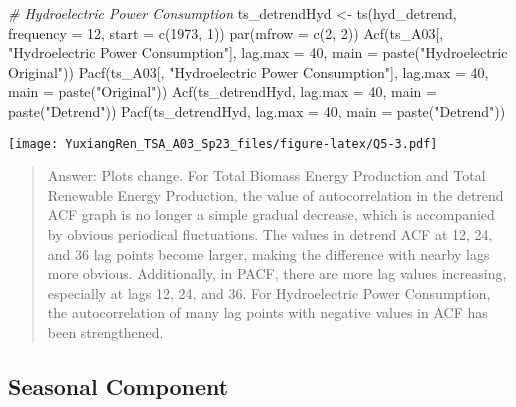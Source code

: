 \documentclass[
]{article}
\newenvironment{Shaded}{\begin{snugshade}}{\end{snugshade}}
\newcommand{\AttributeTok}[1]{\textcolor[rgb]{0.77,0.63,0.00}{#1}}
\newcommand{\CommentTok}[1]{\textcolor[rgb]{0.56,0.35,0.01}{\textit{#1}}}
\newcommand{\DecValTok}[1]{\textcolor[rgb]{0.00,0.00,0.81}{#1}}
\newcommand{\FunctionTok}[1]{\textcolor[rgb]{0.00,0.00,0.00}{#1}}
\newcommand{\NormalTok}[1]{#1}
\newcommand{\OtherTok}[1]{\textcolor[rgb]{0.56,0.35,0.01}{#1}}
\newcommand{\StringTok}[1]{\textcolor[rgb]{0.31,0.60,0.02}{#1}}
\begin{document}
\begin{Shaded}
\begin{Highlighting}[]
\CommentTok{\# Hydroelectric Power Consumption}
\NormalTok{ts\_detrendHyd }\OtherTok{\textless{}{-}} \FunctionTok{ts}\NormalTok{(hyd\_detrend, }\AttributeTok{frequency =} \DecValTok{12}\NormalTok{, }\AttributeTok{start =} \FunctionTok{c}\NormalTok{(}\DecValTok{1973}\NormalTok{, }\DecValTok{1}\NormalTok{))}
\FunctionTok{par}\NormalTok{(}\AttributeTok{mfrow =} \FunctionTok{c}\NormalTok{(}\DecValTok{2}\NormalTok{, }\DecValTok{2}\NormalTok{))}
\FunctionTok{Acf}\NormalTok{(ts\_A03[, }\StringTok{"Hydroelectric Power Consumption"}\NormalTok{], }\AttributeTok{lag.max =} \DecValTok{40}\NormalTok{, }\AttributeTok{main =} \FunctionTok{paste}\NormalTok{(}\StringTok{"Hydroelectric Original"}\NormalTok{))}
\FunctionTok{Pacf}\NormalTok{(ts\_A03[, }\StringTok{"Hydroelectric Power Consumption"}\NormalTok{], }\AttributeTok{lag.max =} \DecValTok{40}\NormalTok{, }\AttributeTok{main =} \FunctionTok{paste}\NormalTok{(}\StringTok{"Original"}\NormalTok{))}
\FunctionTok{Acf}\NormalTok{(ts\_detrendHyd, }\AttributeTok{lag.max =} \DecValTok{40}\NormalTok{, }\AttributeTok{main =} \FunctionTok{paste}\NormalTok{(}\StringTok{"Detrend"}\NormalTok{))}
\FunctionTok{Pacf}\NormalTok{(ts\_detrendHyd, }\AttributeTok{lag.max =} \DecValTok{40}\NormalTok{, }\AttributeTok{main =} \FunctionTok{paste}\NormalTok{(}\StringTok{"Detrend"}\NormalTok{))}
\end{Highlighting}
\end{Shaded}

\texttt{[image: YuxiangRen\_TSA\_A03\_Sp23\_files/figure-latex/Q5-3.pdf]}

\begin{quote}
Answer: Plots change. For Total Biomass Energy Production and Total
Renewable Energy Production, the value of autocorrelation in the detrend
ACF graph is no longer a simple gradual decrease, which is accompanied
by obvious periodical fluctuations. The values in detrend ACF at 12, 24,
and 36 lag points become larger, making the difference with nearby lags
more obvious. Additionally, in PACF, there are more lag values
increasing, especially at lags 12, 24, and 36. For Hydroelectric Power
Consumption, the autocorrelation of many lag points with negative values
in ACF has been strengthened.
\end{quote}

\hypertarget{seasonal-component}{%
\subsection{Seasonal Component}\label{seasonal-component}}
\end{document}
